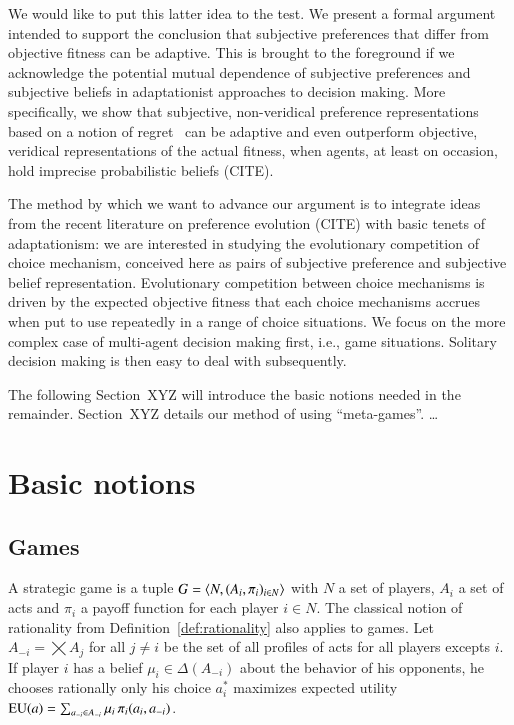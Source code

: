 \documentclass[fleqn,reqno,11pt]{article}
\begin{document}
We would like to put this latter idea to the test. We present a formal argument intended to
support the conclusion that subjective preferences that differ from objective fitness can be
adaptive. This is brought to the foreground if we acknowledge the potential mutual dependence
of subjective preferences and subjective beliefs in adaptationist approaches to decision
making. More specifically, we show that subjective, non-veridical preference representations
based on a notion of regret
\citep[e.g.][]{Savage1951:The-theory-of-s,LoomesSugden1982:Regret-Theory:-}\ can be adaptive and even outperform objective, veridical representations of the
actual fitness, when agents, at least on occasion, hold imprecise probabilistic beliefs
(CITE). 

The method by which we want to advance our argument is to integrate ideas from the recent
literature on preference evolution (CITE) with basic tenets of adaptationism: we are interested
in studying the evolutionary competition of choice mechanism, conceived here as pairs of
subjective preference and subjective belief representation. Evolutionary competition between
choice mechanisms is driven by the expected objective fitness that each choice mechanisms
accrues when put to use repeatedly in a range of choice situations. We focus on the more
complex case of multi-agent decision making first, i.e., game situations. Solitary decision
making is then easy to deal with subsequently.

The following Section~XYZ will introduce the basic notions needed in the remainder. Section~XYZ
details our method of using ``meta-games''. \dots


\section{Basic notions}
\label{sec:basic-notions}

\subsection{Games} \label{sec:games}

A strategic game is a tuple $ G=\left \langle  N, (A_i , \pi_i)_{i \in N} \right\rangle$ with $N$ a set of
players, $A_i$ a set of acts and $\pi_i$ a payoff function for each player $i \in N$. The
classical notion of rationality from Definition~\ref{def:rationality} also applies to
games. Let $A_{-i} = \bigtimes A_j$ for all $j \neq i$ be the set of all profiles of acts for
all players excepts $i$. If player $i$ has a belief $\mu_i \in \Delta(A_{-i})$ about the
behavior of his opponents, he chooses rationally only his choice $a^*_i$ maximizes expected
utility $\operatorname{EU}(a) = \sum_{a_{-i} \in A_{-i}} \mu_i \thinspace \pi_i(a_i, a_{-i})$.
\end{document}

